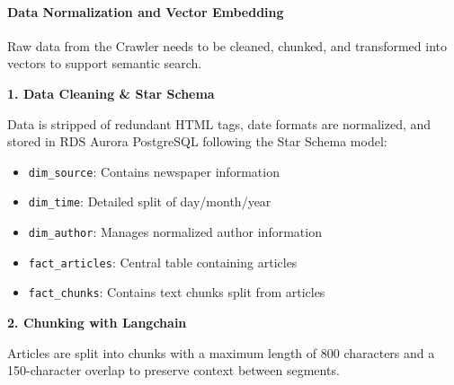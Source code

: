 \hypertarget{data-normalization-and-vector-embedding}{%
\paragraph{Data Normalization and Vector
Embedding}}

Raw data from the Crawler needs to be cleaned, chunked, and transformed
into vectors to support semantic search.

\textbf{1. Data Cleaning \& Star Schema}

Data is stripped of redundant HTML tags, date formats are normalized,
and stored in RDS Aurora PostgreSQL following the Star Schema model:

\begin{itemize}
\tightlist
\item
  \texttt{dim\_source}: Contains newspaper information
\item
  \texttt{dim\_time}: Detailed split of day/month/year
\item
  \texttt{dim\_author}: Manages normalized author information
\item
  \texttt{fact\_articles}: Central table containing articles
\item
  \texttt{fact\_chunks}: Contains text chunks split from articles
\end{itemize}

\textbf{2. Chunking with Langchain}

Articles are split into chunks with a maximum length of 800 characters
and a 150-character overlap to preserve context between segments.

\begin{Shaded}
\begin{Highlighting}[]

\OperatorTok{=}
\OperatorTok{=}\NormalTok{,}
\OperatorTok{=}\NormalTok{,}
\OperatorTok{=}\NormalTok{[}\NormalTok{, }\NormalTok{, }\NormalTok{, }\NormalTok{, }\NormalTok{]}
\NormalTok{)}

\OperatorTok{=}
\end{Highlighting}
\end{Shaded}

